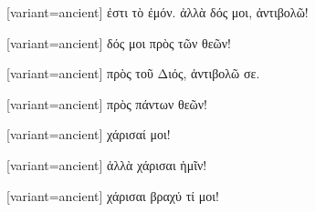 \switchcolumn

\begin{greek}[variant=ancient]%
ἐστι τὸ ἐμόν. ἀλλὰ δός μοι, ἀντιβολῶ!

\end{greek}%
\switchcolumn*

%
%

\switchcolumn

\begin{greek}[variant=ancient]%
δός μοι πρὸς τῶν θεῶν!

\end{greek}%
\switchcolumn*

%
%

\switchcolumn

\begin{greek}[variant=ancient]%
πρὸς τοῦ Διός, ἀντιβολῶ σε.

\end{greek}%
\switchcolumn*

%
%

\switchcolumn

\begin{greek}[variant=ancient]%
πρὸς πάντων θεῶν!

\end{greek}%
\switchcolumn*

%
%

\switchcolumn

\begin{greek}[variant=ancient]%
χάρισαί μοι!

\end{greek}%
\switchcolumn*

%
%

\switchcolumn

\begin{greek}[variant=ancient]%
ἀλλὰ χάρισαι ἡμῖν!

\end{greek}%
\switchcolumn*

%
%

\switchcolumn

\begin{greek}[variant=ancient]%
χάρισαι βραχύ τί μοι!

\end{greek}%
\switchcolumn*

